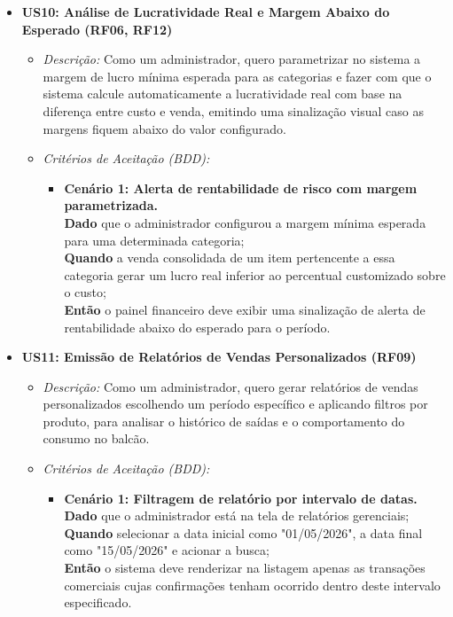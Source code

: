 \documentclass[
	12pt,				%
	openany,			%
	oneside,			%
	a4paper,			%
	english,			%
	french,				%
	spanish,			%
	brazil				%
	]{abntex2}
\begin{document}
\begin{itemize}
    \item \textbf{US10: Análise de Lucratividade Real e Margem Abaixo do Esperado (RF06, RF12)}
    \begin{itemize}
        \item \textit{Descrição:} Como um administrador, quero parametrizar no sistema a margem de lucro mínima esperada para as categorias e fazer com que o sistema calcule automaticamente a lucratividade real com base na diferença entre custo e venda, emitindo uma sinalização visual caso as margens fiquem abaixo do valor configurado.
        \item \textit{Critérios de Aceitação (BDD):}
        \begin{itemize}
            \item \textbf{Cenário 1: Alerta de rentabilidade de risco com margem parametrizada.} \\
            \textbf{Dado} que o administrador configurou a margem mínima esperada para uma determinada categoria; \\
            \textbf{Quando} a venda consolidada de um item pertencente a essa categoria gerar um lucro real inferior ao percentual customizado sobre o custo; \\
            \textbf{Então} o painel financeiro deve exibir uma sinalização de alerta de rentabilidade abaixo do esperado para o período.
        \end{itemize}
    \end{itemize}
    
    \item \textbf{US11: Emissão de Relatórios de Vendas Personalizados (RF09)}
    \begin{itemize}
        \item \textit{Descrição:} Como um administrador, quero gerar relatórios de vendas personalizados escolhendo um período específico e aplicando filtros por produto, para analisar o histórico de saídas e o comportamento do consumo no balcão.
        \item \textit{Critérios de Aceitação (BDD):}
        \begin{itemize}
            \item \textbf{Cenário 1: Filtragem de relatório por intervalo de datas.} \\
            \textbf{Dado} que o administrador está na tela de relatórios gerenciais; \\
            \textbf{Quando} selecionar a data inicial como "01/05/2026", a data final como "15/05/2026" e acionar a busca; \\
            \textbf{Então} o sistema deve renderizar na listagem apenas as transações comerciais cujas confirmações tenham ocorrido dentro deste intervalo especificado.
        \end{itemize}
    \end{itemize}
\end{itemize}
\end{document}
